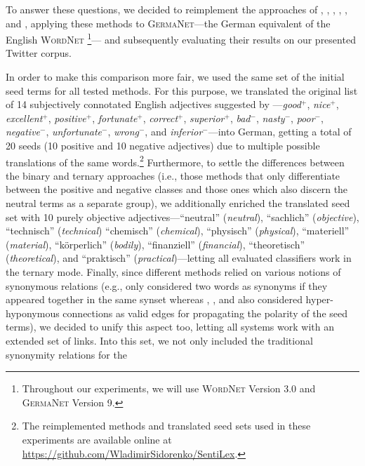 To answer these questions, we decided to reimplement the approaches of
\citet{Hu:04}, \citet{Blair-Goldensohn:08}, \citet{Kim:04,Kim:06},
\citet{Esuli:06c}, \citet{Rao:09}, and \citet{Awadallah:10}, applying
these methods to \textsc{GermaNet}---the German equivalent of the
English \textsc{WordNet} \cite{Hamp:97}\footnote{Throughout our
  experiments, we will use \textsc{WordNet} Version 3.0 and
  \textsc{GermaNet} Version 9.}--- and subsequently evaluating their
results on our presented Twitter corpus.

In order to make this comparison more fair, we used the same set of
the initial seed terms for all tested methods.  For this purpose, we
translated the original list of 14 subjectively connotated English
adjectives suggested by \citet{Turney:03}---\emph{good}$^+$,
\emph{nice}$^+$, \emph{excellent}$^+$, \emph{positive}$^+$,
\emph{fortunate}$^+$, \emph{correct}$^+$, \emph{superior}$^+$,
\emph{bad}$^-$, \emph{nasty}$^-$, \emph{poor}$^-$,
\emph{negative}$^-$, \emph{unfortunate}$^-$, \emph{wrong}$^-$, and
\emph{inferior}$^-$---into German, getting a total of 20 seeds (10
positive and 10 negative adjectives) due to multiple possible
translations of the same words.\footnote{The reimplemented methods and
  translated seed sets used in these experiments are available online
  at \url{https://github.com/WladimirSidorenko/SentiLex}.}
Furthermore, to settle the differences between the binary and ternary
approaches (i.e., those methods that only differentiate between the
positive and negative classes and those ones which also discern the
neutral terms as a separate group), we additionally enriched the
translated seed set with 10 purely objective adjectives---``neutral''
(\emph{neutral}), ``sachlich'' (\emph{objective}), ``technisch''
(\emph{technical}) ``chemisch'' (\emph{chemical}), ``physisch''
(\emph{physical}), ``materiell'' (\emph{material}), ``k\"orperlich''
(\emph{bodily}), ``finanziell'' (\emph{financial}), ``theoretisch''
(\emph{theoretical}), and ``praktisch'' (\emph{practical})---letting
all evaluated classifiers work in the ternary mode.  Finally, since
different methods relied on various notions of synonymous relations
(e.g., \citet{Hu:04} only considered two words as synonyms if they
appeared together in the same synset whereas \citet{Esuli:06c},
\citet{Rao:09}, and \citet{Awadallah:10} also considered
hyper-hyponymous connections as valid edges for propagating the
polarity of the seed terms), we decided to unify this aspect too,
letting all systems work with an extended set of links.  Into this
set, we not only included the traditional synonymity relations for the
